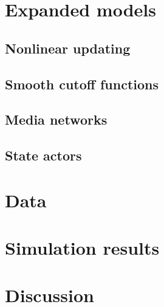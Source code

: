 \documentclass[10pt]{amsart}
\begin{document}
\section{Expanded models}

\subsection{Nonlinear updating}

\subsection{Smooth cutoff functions}

\subsection{Media networks}

\subsection{State actors}

\section{Data}

\section{Simulation results}

\section{Discussion}
\end{document}
